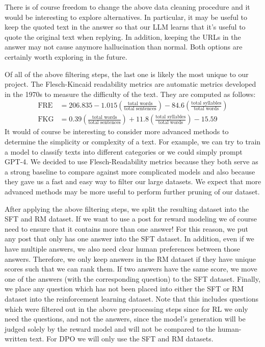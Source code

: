 \documentclass[11pt, oneside]{article}   	%
\begin{document}
There is of course freedom to change the above data cleaning procedure and it would be interesting to explore alternatives. 
In particular, it may be useful to keep the quoted text in the answer so that our LLM learns that it's useful to quote the original text when replying.
In addition, keeping the URLs in the answer may not cause anymore hallucination than normal. 
Both options are certainly worth exploring in the future.

Of all of the above filtering steps, the last one is likely the most unique to our project. 
The Flesch-Kincaid readability metrics are automatic metrics developed in the 1970s to measure the difficulty of the text.
They are computed as follows:
\begin{align}
\text{FRE} &= 206.835-1.015\left(\frac{\text{total words}}{\text{total sentences}}\right)-84.6\left(\frac{\text{total syllables}}{\text{total words}}\right)
\\
\text{FKG} &= 0.39\left(\frac{\text{total words}}{\text{total sentences}}\right)+11.8\left(\frac{\text{total syllables}}{\text{total words}}\right)-15.59
\end{align}
It would of course be interesting to consider more advanced methods to determine the simplicity or complexity of a text.
For example, we can try to train a model to classify texts into different categories or we could simply prompt GPT-4.
We decided to use Flesch-Readability metrics because they both serve as a strong baseline to compare against more complicated models and also because they gave us a fast and easy way to filter our large datasets. 
We expect that more advanced methods may be more useful to perform further pruning of our dataset.

After applying the above filtering steps, we split the resulting dataset into the SFT and RM dataset.
If we want to use a post for reward modeling we of course need to ensure that it contains more than one answer!
For this reason, we put any post that only has one answer into the SFT dataset.
In addition, even if we have multiple answers, we also need clear human preferences between those answers.
Therefore, we only keep answers in the RM dataset if they have unique scores such that we can rank them.
If two answers have the same score, we move one of the answers (with the corresponding question) to the SFT dataset.  
Finally, we place any question which has not been placed into either the SFT or RM dataset into the reinforcement learning dataset.
Note that this includes questions which were filtered out in the above pre-processing steps since for RL we only need the questions, and not the answers, since the model's generation will be judged solely by the reward model and will not be compared to the human-written text. 
For DPO we will only use the SFT and RM datasets.
\end{document}
